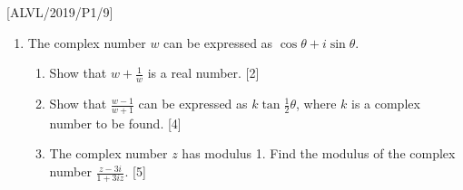 \item {[}ALVL/2019/P1/9{]}
\begin{enumerate}
\item The complex number $w$ can be expressed as $\cos\theta+i\sin\theta$. 
\begin{enumerate}
\item Show that $w+\frac{1}{w}$ is a real number. \hfill{}{[}2{]}
\item Show that $\frac{w-1}{w+1}$ can be expressed as $k\tan\frac{1}{2}\theta$,
where $k$ is a complex number to be found. \hfill{}{[}4{]}
\item The complex number $z$ has modulus 1. Find the modulus of the complex
number $\frac{z-3i}{1+3iz}$. \hfill{}{[}5{]}
\end{enumerate}
\end{enumerate}
